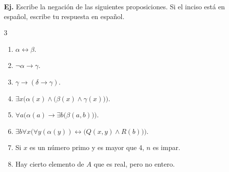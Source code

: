 \documentclass[letterpaper,DIV=14,headsepline,12pt]{scrartcl}
\newcounter{Ejer}
\newcommand{\pts}{}
\newenvironment{ejercicio}[1]{\noindent
    \ifthenelse{\equal{#1}{1}}{\renewcommand{\pts}{\textbf{(#1 pt)}}}{\renewcommand{\pts}{\textbf{(#1 pts)}}}\textbf{Ej. \theEjer} \pts\stepcounter{Ejer}}{\vspace{.3cm}}
\begin{document}
    \begin{ejercicio}{1}
        Escribe la negación de las siguientes proposiciones. Si el inciso está en español, escribe tu respuesta en español.
        \begin{paracol}{3}
            \begin{enumerate}
                \item $\alpha \leftrightarrow \beta$.
                \item $\lnot \alpha \to \gamma$.
                \item $\gamma \to (\delta \to \gamma)$.
            \end{enumerate}

            \switchcolumn
             \begin{enumerate}\setcounter{enumi}{3}
                \item $\exists x \big( \alpha(x) \land \big( \beta(x) \land \gamma(x) \big) \big)$.
                \item $\forall a \big(\alpha(a) \to \exists b \big( \beta(a,b) \big) \big)$.
                \item $\exists b \forall x \big( \forall y(\alpha(y)) \leftrightarrow \big( Q(x,y) \land R(b) \big) \big)$.
            \end{enumerate}

            \switchcolumn
             \begin{enumerate}\setcounter{enumi}{6}
                \item Si $x$ es un número primo y es mayor que 4, $n$ es impar.
                \item Hay cierto elemento de $A$ que es real, pero no entero.
            \end{enumerate}
        \end{paracol}
    \end{ejercicio}
\end{document}

